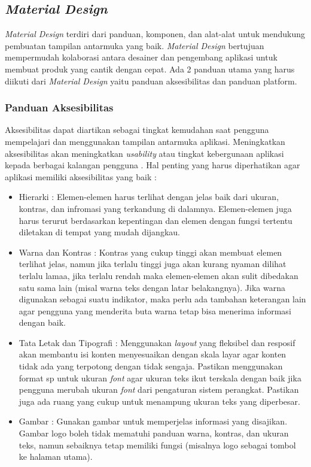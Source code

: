 \subsection{\textit{Material Design}}
\textit{Material Design} terdiri dari panduan, komponen, dan alat-alat untuk mendukung pembuatan tampilan antarmuka yang baik. \textit{Material Design} bertujuan mempermudah kolaborasi antara desainer dan pengembang aplikasi untuk membuat produk yang cantik dengan cepat\cite{materialdesign}. Ada 2 panduan utama yang harus diikuti dari \textit{Material Design} yaitu panduan aksesibilitas dan panduan platform. 

\subsubsection{Panduan Aksesibilitas}
Aksesibilitas dapat diartikan sebagai tingkat kemudahan saat pengguna mempelajari dan menggunakan tampilan antarmuka aplikasi. Meningkatkan aksesibilitas akan meningkatkan \textit{usability} atau tingkat kebergunaan aplikasi kepada berbagai kalangan pengguna \cite{materialdesign}. Hal penting yang harus diperhatikan agar aplikasi memiliki aksesibilitas yang baik :
\begin{itemize}
    \item Hierarki : Elemen-elemen harus terlihat dengan jelas baik dari ukuran, kontras, dan infromasi yang terkandung di dalamnya. Elemen-elemen juga harus terurut berdasarkan kepentingan dan elemen dengan fungsi tertentu diletakan di tempat yang mudah dijangkau.
    \item Warna dan Kontras : Kontras yang cukup tinggi akan membuat elemen terlihat jelas, namun jika terlalu tinggi juga akan kurang nyaman dilihat terlalu lamaa, jika terlalu rendah maka elemen-elemen akan sulit dibedakan satu sama lain (misal warna teks dengan latar belakangnya). Jika warna digunakan sebagai suatu indikator, maka perlu ada tambahan keterangan lain agar pengguna yang menderita buta warna tetap bisa menerima informasi dengan baik.
    \item Tata Letak dan Tipografi : Menggunakan \textit{layout} yang fleksibel dan resposif akan membantu isi konten menyesuaikan dengan skala layar agar konten tidak ada yang terpotong dengan tidak sengaja. Pastikan menggunakan format sp untuk ukuran \textit{font} agar ukuran teks ikut terskala dengan baik jika pengguna merubah ukuran \textit{font} dari pengaturan sistem perangkat. Pastikan juga ada ruang yang cukup untuk menampung ukuran teks yang diperbesar.
    \item Gambar : Gunakan gambar untuk memperjelas informasi yang disajikan. Gambar logo boleh tidak mematuhi panduan warna, kontras, dan ukuran teks, namun sebaiknya tetap memiliki fungsi (misalnya logo sebagai tombol ke halaman utama).  
\end{itemize}

